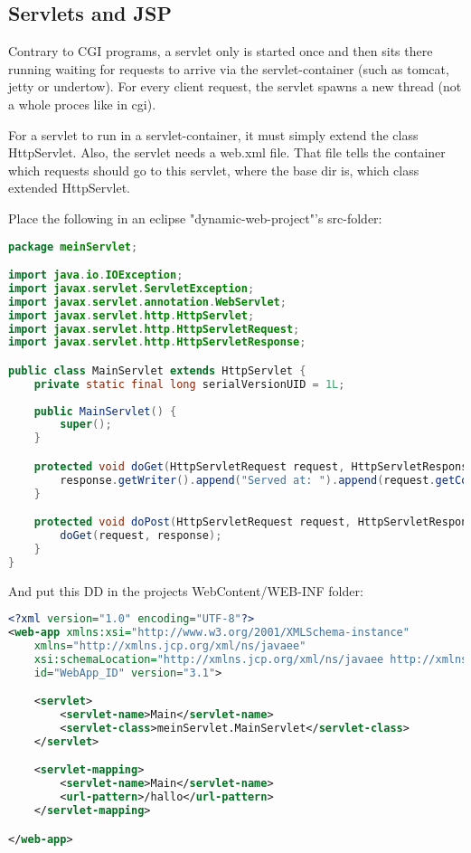  



\subsection{Servlets and JSP}

Contrary to CGI programs, a servlet only is started once and then sits there running waiting for requests to arrive via the servlet-container (such as tomcat, jetty or undertow). For every client request, the servlet spawns a new thread (not a whole proces like in cgi).

For a servlet to run in a servlet-container, it must simply extend the class HttpServlet. Also, the servlet needs a web.xml file. That file tells the container which requests should go to this servlet, where the base dir is, which class extended HttpServlet.


Place the following in an eclipse "dynamic-web-project"'s src-folder:

\begin{lstlisting}[language=java]
package meinServlet;

import java.io.IOException;
import javax.servlet.ServletException;
import javax.servlet.annotation.WebServlet;
import javax.servlet.http.HttpServlet;
import javax.servlet.http.HttpServletRequest;
import javax.servlet.http.HttpServletResponse;

public class MainServlet extends HttpServlet {
	private static final long serialVersionUID = 1L;
       
    public MainServlet() {
        super();
    }

	protected void doGet(HttpServletRequest request, HttpServletResponse response) throws ServletException, IOException {
		response.getWriter().append("Served at: ").append(request.getContextPath());
	}

	protected void doPost(HttpServletRequest request, HttpServletResponse response) throws ServletException, IOException {
		doGet(request, response);
	}
}
\end{lstlisting}

And put this DD in the projects WebContent/WEB-INF folder: 

\begin{lstlisting}[language=xml]
<?xml version="1.0" encoding="UTF-8"?>
<web-app xmlns:xsi="http://www.w3.org/2001/XMLSchema-instance"
	xmlns="http://xmlns.jcp.org/xml/ns/javaee"
	xsi:schemaLocation="http://xmlns.jcp.org/xml/ns/javaee http://xmlns.jcp.org/xml/ns/javaee/web-app_3_1.xsd"
	id="WebApp_ID" version="3.1">

	<servlet>
		<servlet-name>Main</servlet-name>
		<servlet-class>meinServlet.MainServlet</servlet-class>
	</servlet>

	<servlet-mapping>
		<servlet-name>Main</servlet-name>
		<url-pattern>/hallo</url-pattern>
	</servlet-mapping>

</web-app>
\end{lstlisting}

